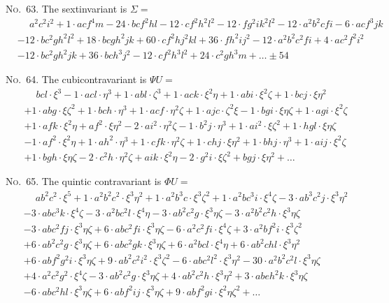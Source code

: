 \documentclass[11pt,a4paper]{article}
\begin{document}
\noindent\textsc{No.~63.} The sextinvariant is $\Sigma =$
\begin{align*}
&\phantom{+} a^2c^2i^2 + 1\cdot acf^4m - 24\cdot bcf^2hl - 12\cdot cf^2h^2l^2 - 12\cdot fg^2ik^2l^2 - 12\cdot a^2b^2cfi - 6\cdot acf^3jk\\
& - 12\cdot bc^2gh^2l^2 + 18\cdot bcgh^2jk + 60\cdot cf^2hj^2kl + 36\cdot fh^2ij^2 - 12\cdot a^2b^2c^2fi + 4\cdot ac^2f^2i^2\\
& - 12\cdot bc^2gh^2jk + 36\cdot bch^3j^2 - 12\cdot cf^2h^3l^2 + 24\cdot c^2gh^3m + \ldots \pm 54
\end{align*}

\noindent\textsc{No.~64.} The cubicontravariant is $\Psi U =$
\begin{align*}
&\phantom{+} bcl\cdot\xi^3 - 1\cdot acl\cdot\eta^3 + 1\cdot abl\cdot\zeta^3 + 1\cdot ack\cdot\xi^2\eta + 1\cdot abi\cdot\xi^2\zeta + 1\cdot bcj\cdot\xi\eta^2\\
& + 1\cdot abg\cdot\xi\zeta^2 + 1\cdot bch\cdot\eta^3 + 1\cdot acf\cdot\eta^2\zeta + 1\cdot ajc\cdot\zeta^2\xi - 1\cdot bgi\cdot\xi\eta\zeta + 1\cdot agi\cdot\xi^2\zeta\\
& + 1\cdot afk\cdot\xi^2\eta + af^2\cdot\xi\eta^2 - 2\cdot ai^2\cdot\eta^2\zeta - 1\cdot b^2j\cdot\eta^3 + 1\cdot ai^2\cdot\xi\zeta^2 + 1\cdot hgl\cdot\xi\eta\zeta\\
& - 1\cdot af^2\cdot\xi^2\eta + 1\cdot ah^2\cdot\eta^3 + 1\cdot cfk\cdot\eta^2\zeta + 1\cdot chj\cdot\xi\eta^2 + 1\cdot bhj\cdot\eta^3 + 1\cdot aij\cdot\xi^2\zeta\\
& + 1\cdot bgh\cdot\xi\eta\zeta - 2\cdot c^2h\cdot\eta^2\zeta + aik\cdot\xi^2\eta - 2\cdot g^2i\cdot\xi\zeta^2 + bgj\cdot\xi\eta^2 + \ldots
\end{align*}

\noindent\textsc{No.~65.} The quintic contravariant is $\Phi U =$
\begin{align*}
&\phantom{+} ab^2c^2\cdot\xi^5 + 1\cdot a^2b^2c^2\cdot\xi^3\eta^2 + 1\cdot a^2b^3c\cdot\xi^3\zeta^2 + 1\cdot a^2bc^3i\cdot\xi^4\zeta - 3\cdot ab^3c^2j\cdot\xi^3\eta^2\\
& - 3\cdot abc^3k\cdot\xi^4\zeta - 3\cdot a^2bc^2l\cdot\xi^4\eta - 3\cdot ab^2c^2g\cdot\xi^3\eta\zeta - 3\cdot a^2b^2c^2h\cdot\xi^3\eta\zeta\\
& - 3\cdot abc^2fj\cdot\xi^3\eta\zeta + 6\cdot abc^2fi\cdot\xi^3\eta\zeta - 6\cdot a^2c^2fi\cdot\xi^4\zeta + 3\cdot a^2bf^2i\cdot\xi^3\zeta^2\\
& + 6\cdot ab^2c^2g\cdot\xi^3\eta\zeta + 6\cdot abc^2gk\cdot\xi^3\eta\zeta + 6\cdot a^2bcl\cdot\xi^4\eta + 6\cdot ab^2chl\cdot\xi^3\eta^2\\
& + 6\cdot abf^2g^2i\cdot\xi^3\eta\zeta + 9\cdot ab^2c^2i^2\cdot\xi^3\zeta^2 - 6\cdot abc^2l^2\cdot\xi^3\eta^2 - 30\cdot a^2b^2c^2l\cdot\xi^3\eta\zeta\\
& + 4\cdot a^2c^2g^2\cdot\xi^4\zeta - 3\cdot ab^2c^2g\cdot\xi^3\eta\zeta + 4\cdot ab^2c^2h\cdot\xi^3\eta^2 + 3\cdot abeh^2k\cdot\xi^3\eta\zeta\\
& - 6\cdot abc^2hl\cdot\xi^3\eta\zeta + 6\cdot abf^2ij\cdot\xi^3\eta\zeta + 9\cdot abf^2gi\cdot\xi^2\eta\zeta^2 + \ldots
\end{align*}
\end{document}
